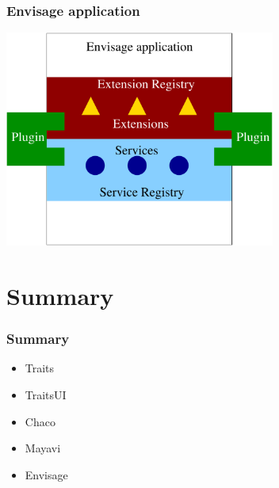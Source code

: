 \documentclass[14pt,compress]{beamer}
\begin{document}
\begin{frame}
  \frametitle{Envisage application}
  \begin{center}
    \includegraphics[width=3.5in,interpolate=true]{images/envisage}
  \end{center}
\end{frame}


\section{Summary}

\begin{frame}
  \frametitle{Summary}
  \begin{itemize}
      \item Traits
      \item TraitsUI
      \item Chaco
      \item Mayavi
      \item Envisage
 \end{itemize}
\end{frame}
\end{document}
